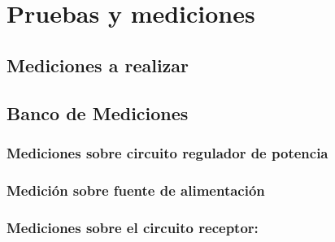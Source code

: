
\section{Pruebas y mediciones}

\subsection{Mediciones a realizar}


\subsection{Banco de Mediciones}

\subsubsection{Mediciones sobre circuito regulador de potencia}


\subsubsection{Medición sobre fuente de alimentación}

\subsubsection{Mediciones sobre el circuito receptor:}

